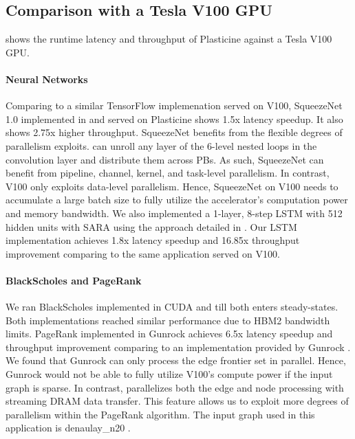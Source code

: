 

\subsection{Comparison with a Tesla V100 GPU}
\label{ssec:abs-performance}
 shows the runtime latency and throughput of Plasticine against a Tesla V100 GPU.

\paragraph{Neural Networks} Comparing to a similar TensorFlow implemenation served on V100, SqueezeNet 1.0 implemented in \name{} and served on Plasticine shows 1.5x latency speedup. It also shows 2.75x higher throughput.
SqueezeNet benefits from the flexible degrees of parallelism \name{} exploits. \name can unroll any layer of the 6-level nested loops in the convolution layer and distribute them across PBs. As such, SqueezeNet can benefit from pipeline, channel, kernel, and task-level parallelism.
In contrast, V100 only exploits data-level parallelism. Hence, SqueezeNet on V100 needs to accumulate a large batch size to fully utilize the accelerator's computation power and memory bandwidth. We also implemented a 1-layer, 8-step LSTM with 512 hidden units with SARA using the approach detailed in \cite{tz_rnn}. Our LSTM implementation achieves 1.8x latency speedup and 16.85x throughput improvement comparing to the same application served on V100.

\paragraph{BlackScholes and PageRank} We ran BlackScholes implemented in CUDA and \name till both enters steady-states. Both implementations reached similar performance due to HBM2 bandwidth limits.
PageRank implemented in \name{} Gunrock achieves 6.5x latency speedup and throughput improvement comparing to an implementation provided by Gunrock \cite{gunrock}. We found that Gunrock can only process the edge frontier set in parallel. Hence, Gunrock would not be able to fully utilize V100's compute power if the input graph is sparse.
In contrast, \name{} parallelizes both the edge and node processing with streaming DRAM data transfer. This feature allows us to exploit more degrees of parallelism within the PageRank algorithm. The input graph used in this application is denaulay\_n20 \cite{delaunayn20}.

